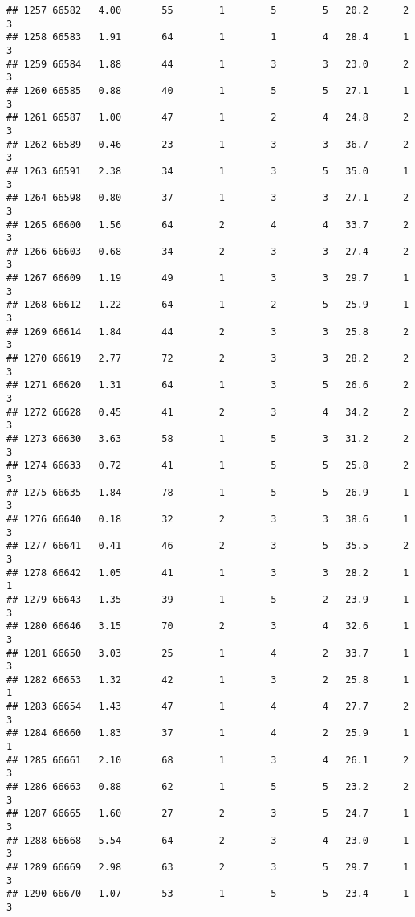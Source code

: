 \documentclass[
]{article}
\begin{document}
\begin{verbatim}
## 1257 66582   4.00       55        1        5        5   20.2      2      3
## 1258 66583   1.91       64        1        1        4   28.4      1      3
## 1259 66584   1.88       44        1        3        3   23.0      2      3
## 1260 66585   0.88       40        1        5        5   27.1      1      3
## 1261 66587   1.00       47        1        2        4   24.8      2      3
## 1262 66589   0.46       23        1        3        3   36.7      2      3
## 1263 66591   2.38       34        1        3        5   35.0      1      3
## 1264 66598   0.80       37        1        3        3   27.1      2      3
## 1265 66600   1.56       64        2        4        4   33.7      2      3
## 1266 66603   0.68       34        2        3        3   27.4      2      3
## 1267 66609   1.19       49        1        3        3   29.7      1      3
## 1268 66612   1.22       64        1        2        5   25.9      1      3
## 1269 66614   1.84       44        2        3        3   25.8      2      3
## 1270 66619   2.77       72        2        3        3   28.2      2      3
## 1271 66620   1.31       64        1        3        5   26.6      2      3
## 1272 66628   0.45       41        2        3        4   34.2      2      3
## 1273 66630   3.63       58        1        5        3   31.2      2      3
## 1274 66633   0.72       41        1        5        5   25.8      2      3
## 1275 66635   1.84       78        1        5        5   26.9      1      3
## 1276 66640   0.18       32        2        3        3   38.6      1      3
## 1277 66641   0.41       46        2        3        5   35.5      2      3
## 1278 66642   1.05       41        1        3        3   28.2      1      1
## 1279 66643   1.35       39        1        5        2   23.9      1      3
## 1280 66646   3.15       70        2        3        4   32.6      1      3
## 1281 66650   3.03       25        1        4        2   33.7      1      3
## 1282 66653   1.32       42        1        3        2   25.8      1      1
## 1283 66654   1.43       47        1        4        4   27.7      2      3
## 1284 66660   1.83       37        1        4        2   25.9      1      1
## 1285 66661   2.10       68        1        3        4   26.1      2      3
## 1286 66663   0.88       62        1        5        5   23.2      2      3
## 1287 66665   1.60       27        2        3        5   24.7      1      3
## 1288 66668   5.54       64        2        3        4   23.0      1      3
## 1289 66669   2.98       63        2        3        5   29.7      1      3
## 1290 66670   1.07       53        1        5        5   23.4      1      3

\end{verbatim}
\end{document}
